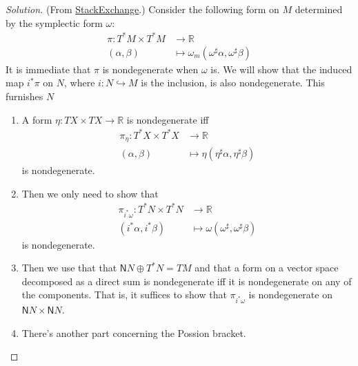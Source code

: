 \begin{proof}[Solution]\leavevmode
	(From \href{https://math.stackexchange.com/questions/4974063/level-set-submanifold-is-symplectic-iff-poisson-bracket-matrix-is-nonsingular?noredirect=1#comment10675364_4974063}{StackExchange}.) \hspace{0.5em} Consider the following form on $M$ determined by the symplectic form $\omega$:
	\begin{align*}
		\pi: T^*M\times T^*M  &\longrightarrow \mathbb{R} \\
		(\alpha,\beta) &\longmapsto \omega_m(\omega ^\sharp\alpha,\omega ^\sharp\beta)
	\end{align*}
It is immediate that $\pi$ is nondegenerate when $\omega$ is. We will show that the induced map $i^*\pi$ on $N$, where $i:N\hookrightarrow M$ is the inclusion, is also nondegenerate. This furnishes $N$

\begin{enumerate}[label=\textbf{Step \arabic*}]
\item \begin{claim}\leavevmode
	A form $\eta:TX\times TX\to \mathbb{R}$ is nondegenerate iff
	\begin{align*}
		\pi_\eta: T^*X\times T^*X &\longrightarrow \mathbb{R} \\
		(\alpha,\beta) &\longmapsto \eta(\eta ^\sharp \alpha,\eta^\sharp\beta)
	\end{align*}
	is nondegenerate.
\end{claim}
\item Then we only need to show that
\begin{align*}
	\pi_{i^*\omega}: T^*N\times T^*N &\longrightarrow \mathbb{R} \\
	(i^*\alpha,i^*\beta) &\longmapsto \omega(\omega ^\sharp,\omega ^\sharp\beta)
\end{align*}
is nondegenerate.

\item Then we use that that $\mathsf{N}N\oplus T^*N=TM$ and that a form on a vector space decomposed as a direct sum is nondegenerate iff it is nondegenerate on any of the components. That is, it suffices to show that $\pi_{i^*\omega}$ is nondegenerate on $\mathsf{N}N\times \mathsf{N}N$.

\item There's another part concerning the Possion bracket.
\end{enumerate}
\end{proof}


